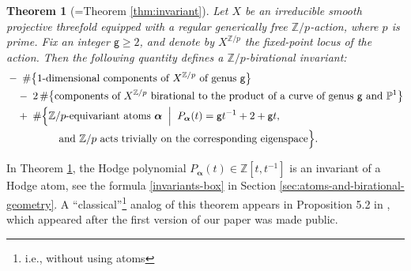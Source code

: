 \documentclass[12pt,a4paper]{amsart}
\newtheorem{Mtheorem}{Theorem}
\theoremstyle{definition}
\theoremstyle{remark}
\begin{document}
\begin{Mtheorem}[=Theorem \ref{thm:invariant}]\label{ithm:atoms-meet-symbols}
    Let \(X\) be an irreducible smooth projective threefold equipped with a regular generically free \(\mathbb{Z}/p\)-action, where \(p\) is prime. Fix an integer \(\mathsf{g} \geq 2\), and denote by \(X^{\mathbb{Z}/p}\) the fixed-point locus of the action.  Then the following quantity defines a \(\mathbb{Z}/p\)-birational invariant:
\begin{equation}
\begin{split}
  &-\;\#\bigl\{
    \text{1-dimensional components of } X^{\mathbb{Z}/p} 
    \text{ of genus } \mathsf{g} 
  \bigr\} \\
  &\quad -\; 2\,\#\bigl\{
    \text{components of $X^{\mathbb{Z}/p}$ birational to the product of a curve of genus } \mathsf{g} 
    \text{ and } \mathbb{P}^1 
  \bigr\} \\
  &\quad +\; \#\Bigl\{ 
    \mathbb{Z}/p\text{-equivariant atoms } \boldsymbol\alpha 
    \;\Bigm|\; P_{\boldsymbol\alpha}(t) = \mathsf{g} t^{-1} + 2 + \mathsf{g} t, \\
  &\hspace{5em} 
    \text{and } \mathbb{Z}/p \text{ acts trivially on the corresponding eigenspace}
  \Bigr\}.
\end{split}
\end{equation}

\end{Mtheorem}
In Theorem \ref{ithm:atoms-meet-symbols}, the Hodge polynomial $P_{\boldsymbol\alpha}(t)\in \mathbb Z[t,t^{-1}]$ is an invariant of a Hodge atom, see the formula \eqref{invariants-box} in Section \ref{sec:atoms-and-birational-geometry}. A ``classical''\footnote{i.e., without using atoms} analog of this theorem appears in Proposition 5.2 in \cite{kresch2025intermediatejacobiansburnsideinvariants}, which appeared after the first version of our paper was made public.
\end{document}
